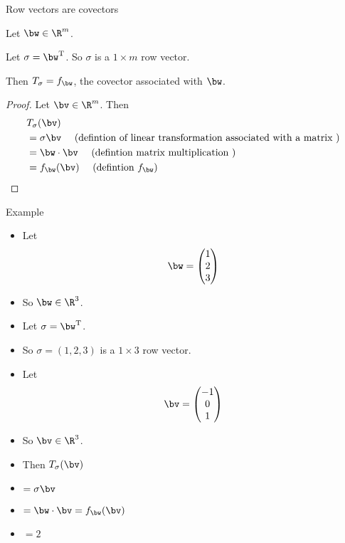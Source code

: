 \documentclass{beamer}
\begin{document}

\beamerdefaultoverlayspecification{}

\begin{frame}{Row vectors are covectors}

\begin{lemma}
Let $\bw\in\R^m$.

\pause

Let $\sigma = \bw^{\text{T}}$. So $\sigma$ is a $1\times m$
row vector.

\pause

Then $T_{\sigma} = f_{\bw}$, the covector associated with $\bw$.
\end{lemma}

\pause

\begin{proof}
Let $\bv\in\R^m$. Then
\pause
\begin{align*}
&T_{\sigma}(\bv) \\
&=\sigma \bv \quad \text{ (defintion of linear transformation associated with a matrix ) }\\
&=\bw \cdot \bv \quad \text{ (defintion matrix multiplication ) }\\
&= f_{\bw}(\bv) \quad \text{ (defintion $f_{\bw}$) }
\end{align*}
\end{proof}
\end{frame}


\beamerdefaultoverlayspecification{<+->}

\begin{frame}{Example}

\begin{itemize}
\item Let
$$
\bw =
\begin{pmatrix}
1 \\ 2 \\ 3
\end{pmatrix}
$$
\item So $\bw\in\R^3$.
\item Let $\sigma = \bw^{\text{T}}$.
\item So $\sigma = (1, 2, 3)$ is a $1\times 3$ row vector.
\item Let
$$
\bv =
\begin{pmatrix}
-1 \\ 0 \\ 1
\end{pmatrix}
$$
\item So $\bv\in\R^3$.
\item Then $T_{\sigma}(\bv)$
\item $=\sigma \bv$
\item $=\bw\cdot \bv =f_{\bw}(\bv)$
\item $=2$
\end{itemize}
\end{frame}

\end{document}

